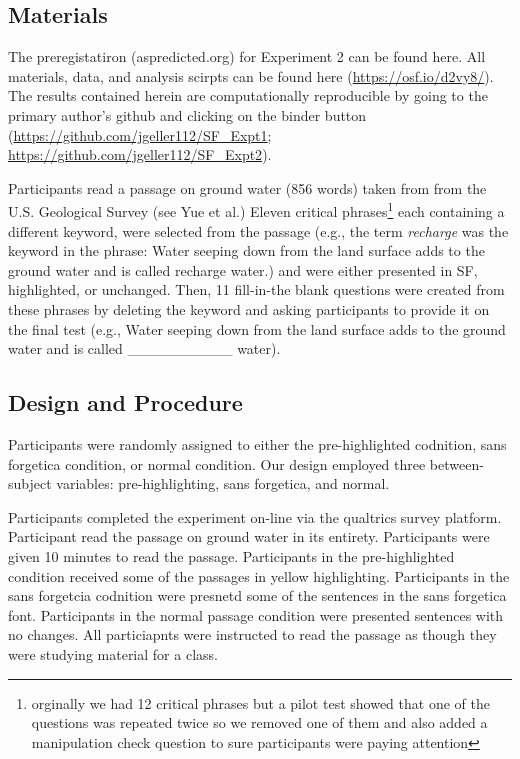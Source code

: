 \documentclass[pdf]{apa6}
\begin{document}
\hypertarget{materials-1}{%
\subsection{Materials}\label{materials-1}}

The preregistatiron (aspredicted.org) for Experiment 2 can be found here. All materials, data, and analysis scirpts can be found here (\url{https://osf.io/d2vy8/}). The results contained herein are computationally reproducible by going to the primary author's github and clicking on the binder button (\url{https://github.com/jgeller112/SF_Expt1}; \url{https://github.com/jgeller112/SF_Expt2}).

Participants read a passage on ground water (856 words) taken from from the U.S. Geological Survey (see Yue et al.) Eleven critical phrases\footnote{orginally we had 12 critical phrases but a pilot test showed that one of the questions was repeated twice so we removed one of them and also added a manipulation check question to sure participants were paying attention} each containing a different keyword, were selected from the passage (e.g., the term \emph{recharge} was the keyword in the phrase: Water seeping down from the land surface adds to the ground water and is called recharge water.) and were either presented in SF, highlighted, or unchanged. Then, 11 fill-in-the blank questions were created from these phrases by deleting the keyword and asking participants to provide it on the final test (e.g., Water seeping down from the land surface adds to the ground water and is called \_\_\_\_\_\_\_\_\_\_ water).

\hypertarget{design-and-procedure}{%
\subsection{Design and Procedure}\label{design-and-procedure}}

Participants were randomly assigned to either the pre-highlighted codnition, sans forgetica condition, or normal condition. Our design employed three between-subject variables: pre-highlighting, sans forgetica, and normal.

Participants completed the experiment on-line via the qualtrics survey platform. Participant read the passage on ground water in its entirety. Participants were given 10 minutes to read the passage. Participants in the pre-highlighted condition received some of the passages in yellow highlighting. Participants in the sans forgetcia codnition were presnetd some of the sentences in the sans forgetica font. Participants in the normal passage condition were presented sentences with no changes. All particiapnts were instructed to read the passage as though they were studying material for a class.
\end{document}
